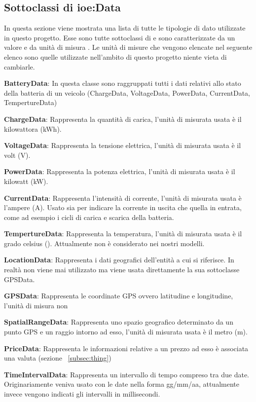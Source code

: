 \subsection{Sottoclassi di ioe:Data}\label{subsec:ioe-data}

In questa sezione viene mostrata una lista di tutte le tipologie di dato utilizzate in questo progetto. Esse sono tutte sottoclassi di  e sono caratterizzate da un valore e da unità di misura . Le unità di misure che vengono elencate nel seguente elenco sono quelle utilizzate nell'ambito di questo progetto niente vieta di cambiarle.

\begin{description}
	\item \textbf{BatteryData}: In questa classe sono raggruppati tutti i dati relativi allo stato della batteria di un veicolo (ChargeData, VoltageData, PowerData, CurrentData, TempertureData)
	\item \textbf{ChargeData}: Rappresenta la quantità di carica, l'unità di misurata usata è il kilowattora (kWh).
	\item \textbf{VoltageData}: Rappresenta la tensione elettrica, l'unità di misurata usata è il volt (V).
	\item \textbf{PowerData}: Rappresenta la potenza elettrica, l'unità di misurata usata è il kilowatt (kW). 
	\item \textbf{CurrentData}: Rappresenta l'intensità di corrente, l'unità di misurata usata è l'ampere (A). Usato sia per indicare la corrente in uscita che quella in entrata, come ad esempio i cicli di carica e scarica della batteria.
	\item \textbf{TempertureData}: Rappresenta la temperatura, l'unità di misurata usata è il grado celsius (\textcelsius). Attualmente non è considerato nei nostri modelli.
	\item \textbf{LocationData}: Rappresenta i dati geografici dell'entità a cui si riferisce. In realtà non viene mai utilizzato ma viene usata direttamente la sua sottoclasse GPSData.
	\item \textbf{GPSData}: Rappresenta le coordinate GPS ovvero latitudine e longitudine, l'unità di misura non 
	\item \textbf{SpatialRangeData}: Rappresenta uno spazio geografico determinato da un punto GPS e un raggio intorno ad esso, l'unità di misurata usata è il metro (m).
	\item \textbf{PriceData}: Rappresenta le informazioni relative a un prezzo ad esso è associata una valuta (sezione ~\ref{subsec:thing})
	\item \textbf{TimeIntervalData}: Rappresenta un intervallo di tempo compreso tra due date. Originariamente veniva usato con le date nella forma gg/mm/aa, attualmente invece vengono indicati gli intervalli in millisecondi.
\end{description}


